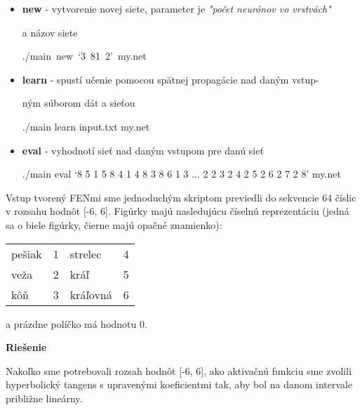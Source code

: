 \documentclass[12pt]{article}
\newcommand{\mysmallsection}[1]{\vspace{0.5cm}{\centering\large\textbf{#1}\\}\normalsize\vspace{0.5cm}}
\begin{document}
\begin{itemize}
\item \textbf{new} - vytvorenie novej siete, parameter je \textit{"počet neurónov vo vrstvách"}

\hspace{1cm} a názov siete

{\centering\small ./main~new~`3~81~2'~my.net\\}

\item \textbf{learn} - spustí učenie pomocou spätnej propagácie nad daným vstup-

\hspace{1.3cm}ným súborom dát a sieťou

{\centering\small ./main learn input.txt my.net \\}

\item \textbf{eval} - vyhodnotí sieť nad daným vstupom pre danú sieť

{\centering\small ./main eval `8 5 1 5 8 4 1 4 8 3 8 6 1 3 ... 2 2 3 2 4 2 5 2 6 2 7 2 8' my.net \\}

\end{itemize}

\mysmallsection{Prístup 1}

Vstup tvorený FENmi sme jednoduchým skriptom previedli do sekvencie 64 číslic v rozsahu hodnôt [-6, 6]. Figúrky majú nasledujúcu číselnú reprezentáciu (jedná sa o biele figúrky, čierne majú opačné znamienko):

\begin{center}
{\small
\hspace*{-1cm}\begin{tabular}{| l l | l l |}
\hline
 pešiak & 1 & strelec & 4 \\
 veža & 2 & kráľ & 5 \\
 kôň & 3 & kráľovná & 6\\
\hline
\end{tabular}
}
\end{center}

\noindent a prázdne políčko má hodnotu 0.

{\vspace*{0.5cm}\centering\textbf{Riešenie}\\}

Nakoľko sme potrebovali rozsah hodnôt [-6, 6], ako aktivačnú funkciu sme zvolili hyperbolický tangens s upravenými koeficientmi tak, aby bol na danom intervale približne lineárny. 
\end{document}
